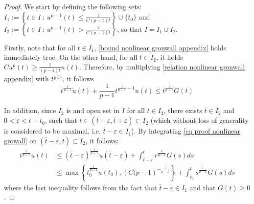 \documentclass[reqno]{amsart}
\theoremstyle{plain}
\theoremstyle{definition}
\theoremstyle{remark}
\begin{document}
\begin{proof} 
We start by defining the following sets: 
$I_{1}:=\left\{t\in I ~:~ u^{p-1}(t) \leq \frac{1}{C(p-1)t} \right\}\cup\{t_{0}\}$ and $I_{2}:= \left\{t\in I ~:~ u^{p-1}(t) > \frac{1}{C(p-1)t} \right\}$, so that $I=I_{1}\cup I_{2}$.

Firstly, note that for all $t\in I_{1}$, \eqref{bound nonlinear gronwall appendix} holds immediately true.
On the other hand, for all $t\in I_{2}$, it holds  $Cu^{p}(t) \geq \frac{1}{(p-1)t}u(t)$. Therefore, by multiplying \eqref{relation nonlinear gronwall appendix} with $t^{\frac{1}{p-1}}$, it follows
\begin{equation}\label{eq proof nonlinear growall}
	t^{\frac{1}{p-1}}\dot{u}(t) +\frac{1}{p-1}t^{\frac{1}{p-1}-1}u(t) \leq t^{\frac{1}{p-1}}G(t)
\end{equation}

In addition, since $I_{2}$ is and open set in $I$ for all $t\in I_{2}$, there exists $\bar{t} \in I_{2}$ and $0<\varepsilon<t-t_{0}$, such that $t\in (\bar{t}-\varepsilon,\bar{t}+\varepsilon)\subset I_{2}$ (which without loss of generality is considered to be maximal, i.e. $\bar{t}-\varepsilon \in I_{1}$). 
By integrating \eqref{eq proof nonlinear growall} on $(\bar{t}-\varepsilon,t)\subset I_{2}$, it follows:
\begin{equation}
	\begin{aligned}
	t^{\frac{1}{p-1}}u(t) & \leq (\bar{t}-\varepsilon)^{\frac{1}{p-1}}u(\bar{t}-\varepsilon) + \int_{\bar{t}-\varepsilon}^{t}r^{\frac{1}{p-1}}G(s)ds\\
	& \leq 	\max\left\{t_{0}^{\frac{1}{p-1}}u(t_{0}), \left(C(p-1\right)^{-\frac{1}{p-1}}\right\} +\int_{t_{0}}^{t}s^{\frac{1}{p-1}}G(s) ds
	\end{aligned}
\end{equation}	
where the last inequality follows from the fact that $\bar{t} - \varepsilon \in I_{1}$ and that $G(t)\geq 0$.
\end{proof}
\end{document}
